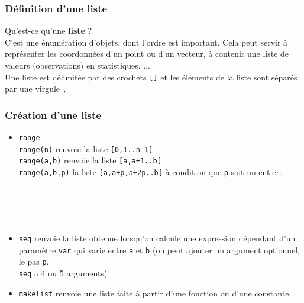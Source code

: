 \documentclass[12pt,a4paper]{book}
\begin{document}
\begin{giacjshere}
\subsubsection{D\'efinition d'une liste}\index{[]}
Qu'est-ce qu'une {\bf liste} ?\\
C'est une \'enum\'eration d'objets, dont l'ordre est important. 
Cela peut servir \`a repr\'esenter les coordonn\'ees d'un point ou
d'un vecteur, \`a contenir une liste de valeurs (observations) 
en statistiques, ...\\
Une liste est d\'elimit\'ee par des crochets {\tt []} et les \'el\'ements de 
la liste sont s\'epar\'es par une virgule {\tt ,}\\ 
\subsubsection{Cr\'eation d'une liste}\index{\$}
\begin{itemize}
\item {\tt range}\\
{\tt range(n)} renvoie la liste {\tt [0,1..n-1]}\\
{\tt range(a,b)} renvoie la liste {\tt [a,a+1..b[}\\
{\tt range(a,b,p)} la liste {\tt [a,a+p,a+2p..b[} \`a condition que {\tt p} 
soit un entier.\\
\\
\\
\\
\\
\item {\tt seq} renvoie la liste obtenue lorsqu'on calcule
une expression d\'ependant d'un param\`etre {\tt var} qui varie entre {\tt a} 
et {\tt  b} (on peut ajouter un argument optionnel, le pas {\tt p}.\\
{\tt seq} a 4 ou 5 arguments)
\item {\tt makelist} renvoie une liste faite à partir d'une fonction ou d'une 
constante.\\
\end{itemize}


\end{giacjshere}
\end{document}
